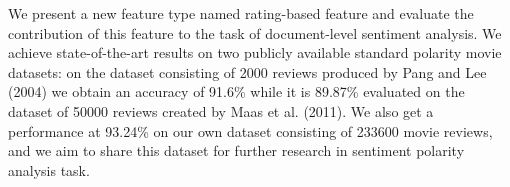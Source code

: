 We present a new feature type named rating-based feature and evaluate the contribution of this feature to the task of document-level sentiment analysis. We achieve state-of-the-art results on two publicly available standard polarity movie datasets: on the dataset consisting of 2000 reviews produced by Pang and Lee (2004) we obtain an accuracy of 91.6\% while it is 89.87\% evaluated on the dataset of 50000 reviews created by Maas et al. (2011). We also get a performance at 93.24\% on our own dataset consisting of 233600 movie reviews, and we aim to share this dataset for further research in sentiment polarity analysis task.
